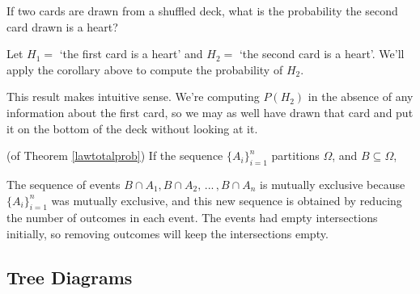 \begin{examp}
If two cards are drawn from a shuffled deck, what is the probability the second card drawn is a heart?
\par
\noindent Let $H_1 =$ `the first card is a heart' and $H_2 =$ `the second card is a heart'. We'll apply the corollary above to compute the probability of $H_2$.
\par
\noindent This result makes intuitive sense. We're computing $P(H_2)$ in the absence of any information about the first card, so we may as well have drawn that card and put it on the bottom of the deck without looking at it.
\end{examp}
\begin{pf} (of Theorem \ref{lawtotalprob}) If the sequence $\{A_i\}_{i=1}^n$ partitions $\Omega$, and $B \subseteq \Omega$,
\par
\noindent The sequence of events $B \cap A_1, B \cap A_2, \, ... \,, B \cap A_n$ is mutually exclusive because $\{A_i\}_{i=1}^{n}$ was mutually exclusive, and this new sequence is obtained by reducing the number of outcomes in each event. The events had empty intersections initially, so removing outcomes will keep the intersections empty.
\end{pf}

\subsection*{Tree Diagrams}

